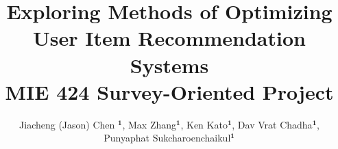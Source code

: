 \documentclass{ieeetj}
\def\authorrefmark#1{\ensuremath{^{\textbf{#1}}}}
\begin{document}




\title{ Exploring Methods of Optimizing User Item Recommendation Systems\\
       \large{MIE 424 Survey-Oriented Project}}

\normalsize{\author{Jiacheng (Jason) Chen \authorrefmark{1}, Max Zhang\authorrefmark{1}, Ken Kato\authorrefmark{1}, Dav Vrat Chadha\authorrefmark{1}, Punyaphat Sukcharoenchaikul\authorrefmark{1}}}



\end{document}
